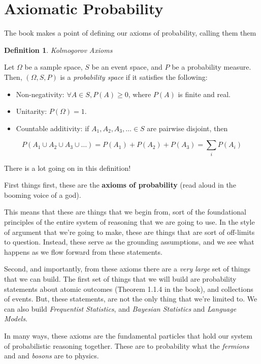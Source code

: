 \documentclass[
]{book}
\providecommand{\tightlist}{%
  \setlength{\itemsep}{0pt}\setlength{\parskip}{0pt}}
\theoremstyle{definition}
\newtheorem{definition}{Definition}[chapter]
\theoremstyle{definition}
\theoremstyle{definition}
\theoremstyle{definition}
\theoremstyle{remark}
\begin{document}
\section{Axiomatic Probability}\label{axiomatic-probability}

The book makes a point of defining our axioms of probability, calling them them

\begin{definition}
\emph{Kolmogorov Axioms}

Let \(\Omega\) be a sample space, \(S\) be an event space, and \(P\) be a probability measure. Then, \((\Omega, S, P)\) is a \emph{probability space} if it satisfies the following:

\begin{itemize}
\tightlist
\item
  Non-negativity: \(\forall A \in S, P(A) \geq 0\), where \(P(A)\) is finite and real.
\item
  Unitarity: \(P(\Omega)=1\).
\item
  Countable additivity: if \(A_1, A_2, A_3, \dots \in S\) are pairwise disjoint, then
\end{itemize}

\[
P(A_1 \cup A_2 \cup A_3 \cup \dots) = P(A_1) + P(A_2) + P(A_3) = \sum_{i}P(A_{i})
\]
\end{definition}

There is a lot going on in this definition!

First things first, these are the \textbf{axioms of probability} (read aloud in the booming voice of a god).

This means that these are things that we begin from, sort of the foundational principles of the entire system of reasoning that we are going to use. In the style of argument that we're going to make, these are things that are sort of off-limits to question. Instead, these serve as the grounding assumptions, and we see what happens as we flow forward from these statements.

Second, and importantly, from these axioms there are a \emph{very large} set of things that we can build. The first set of things that we will build are probability statements about atomic outcomes (Theorem 1.1.4 in the book), and collections of events. But, these statements, are not the only thing that we're limited to. We can also build \emph{Frequentist Statistics}, and \emph{Bayesian Statistics} and \emph{Language Models}.

In many ways, these axioms are the fundamental particles that hold our system of probabilistic reasoning together. These are to probability what the \emph{fermions} and and \emph{bosons} are to physics.
\end{document}
